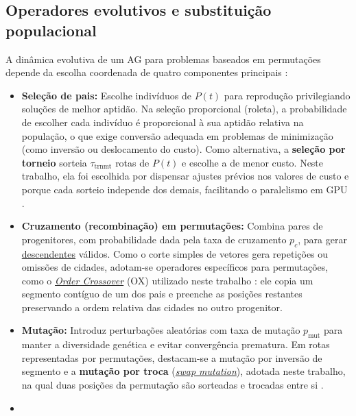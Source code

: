 \subsection{Operadores evolutivos e substituição populacional}\label{sec-231-operadores-substituicao}

A dinâmica evolutiva de um AG para problemas baseados em permutações depende da escolha coordenada de quatro componentes principais \autocite{goldberg1989genetic,eiben2015introduction,larranaga1999genetic}:

\begin{itemize}
      \item
            \textbf{Seleção de pais:} Escolhe indivíduos de \(P(t)\) para reprodução privilegiando soluções de melhor aptidão. Na seleção proporcional (roleta), a probabilidade de escolher cada indivíduo é proporcional à sua aptidão relativa na população, o que exige conversão adequada em problemas de minimização (como inversão ou deslocamento do custo).
            Como alternativa, a \textbf{seleção por torneio} sorteia \(\tau_{\text{trnmt}}\) rotas de \(P(t)\) e escolhe a de menor custo. Neste trabalho, ela foi escolhida por dispensar ajustes prévios nos valores de custo e porque cada sorteio independe dos demais, facilitando o paralelismo em GPU \autocite{goldberg1989genetic,eiben2015introduction}.
      \item
            \textbf{Cruzamento (recombinação) em permutações:} Combina pares de progenitores, com probabilidade dada pela taxa de cruzamento \(p_c\), para gerar \hyperlink{term:offspring}{descendentes} válidos. Como o corte simples de vetores gera repetições ou omissões de cidades, adotam-se operadores específicos para permutações, como o \hyperlink{term:crossover}{\emph{Order Crossover}} (OX) utilizado neste trabalho \autocite{larranaga1999genetic}: ele copia um segmento contíguo de um dos pais e preenche as posições restantes preservando a ordem relativa das cidades no outro progenitor.
      \item
            \textbf{Mutação:} Introduz perturbações aleatórias com taxa de mutação \(p_{\text{mut}}\) para manter a diversidade genética e evitar convergência prematura.
            Em rotas representadas por permutações, destacam-se a mutação por inversão de segmento e a \textbf{mutação por troca} (\hyperlink{term:swap-mutation}{\emph{swap mutation}}), adotada neste trabalho, na qual duas posições da permutação são sorteadas e trocadas entre si \autocite{larranaga1999genetic,eiben2015introduction}.
      \item

\end{itemize}
